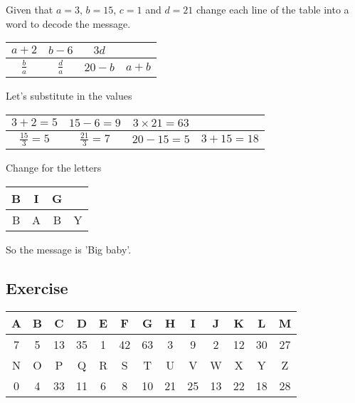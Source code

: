 \begin{exmp}
Given that $a= 3$, $b = 15$, $c= 1$ and $d = 21$ change each line of the table into a word to decode the message.

\vspace{3 mm}

\renewcommand{\arraystretch}{3}
\begin{tabular}{|c|c|c|c|}
\hline
$a + 2$ & $b - 6$ & $3d$ &  \\
\hline
$\displaystyle\frac{b}{a}$ & $\displaystyle\frac{d}{a}$ & $20 - b$ & $a + b$ \\
\hline
\end{tabular}

\vspace{3 mm}

Let's substitute in the values

\vspace{3 mm}

\begin{tabular}{|c|c|c|c|}
\hline
$3 + 2 = 5$ & $15 - 6 = 9$ & $3 \times 21 = 63$ &  \\
\hline
$\displaystyle \frac{15}{3} = 5$ & $\displaystyle \frac{21}{3} = 7$ & $20 - 15 = 5$ &$3 + 15 = 18$ \\
\hline
\end{tabular}

\vspace{3 mm}

Change for the letters

\vspace{3 mm}

\renewcommand{\arraystretch}{1}
\begin{tabular}{|c|c|c|c|}
\hline
B & I & G &  \\
\hline
B & A & B & Y \\
\hline
\end{tabular}

\vspace{3 mm}

So the message is 'Big baby'.
\end{exmp}
\pagebreak
\subsection{Exercise}
\begin{tabular}{|c|c|c|c|c|c|c|c|c|c|c|c|c|}
  \hline
  A & B & C & D & E & F & G & H & I & J & K & L & M \\
  \hline
  7 & 5 & 13 & 35 & 1 & 42 & 63 & 3 & 9 & 2 & 12 & 30 & 27\\
  \hline
  \hline
  N & O & P & Q & R & S & T & U & V & W & X & Y & Z\\
  \hline
  0 & 4 & 33 & 11 & 6 & 8 & 10 & 21 & 25 & 13 & 22 & 18 & 28\\
  \hline
\end{tabular}

